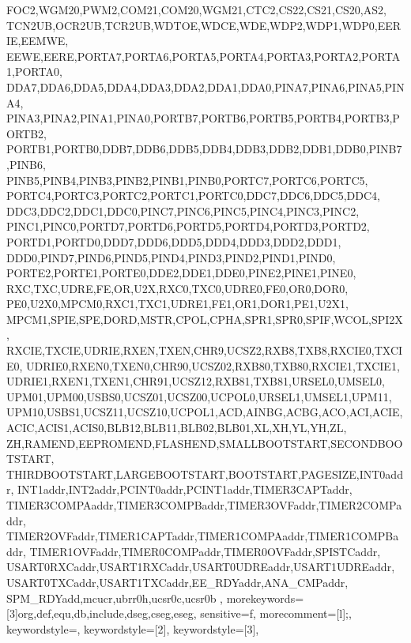 {{        FOC2,WGM20,PWM2,COM21,COM20,WGM21,CTC2,CS22,CS21,CS20,AS2,
        TCN2UB,OCR2UB,TCR2UB,WDTOE,WDCE,WDE,WDP2,WDP1,WDP0,EERIE,EEMWE,
        EEWE,EERE,PORTA7,PORTA6,PORTA5,PORTA4,PORTA3,PORTA2,PORTA1,PORTA0,
        DDA7,DDA6,DDA5,DDA4,DDA3,DDA2,DDA1,DDA0,PINA7,PINA6,PINA5,PINA4,
        PINA3,PINA2,PINA1,PINA0,PORTB7,PORTB6,PORTB5,PORTB4,PORTB3,PORTB2,
        PORTB1,PORTB0,DDB7,DDB6,DDB5,DDB4,DDB3,DDB2,DDB1,DDB0,PINB7,PINB6,
        PINB5,PINB4,PINB3,PINB2,PINB1,PINB0,PORTC7,PORTC6,PORTC5,
        PORTC4,PORTC3,PORTC2,PORTC1,PORTC0,DDC7,DDC6,DDC5,DDC4,
        DDC3,DDC2,DDC1,DDC0,PINC7,PINC6,PINC5,PINC4,PINC3,PINC2,
        PINC1,PINC0,PORTD7,PORTD6,PORTD5,PORTD4,PORTD3,PORTD2,
        PORTD1,PORTD0,DDD7,DDD6,DDD5,DDD4,DDD3,DDD2,DDD1,
        DDD0,PIND7,PIND6,PIND5,PIND4,PIND3,PIND2,PIND1,PIND0,
        PORTE2,PORTE1,PORTE0,DDE2,DDE1,DDE0,PINE2,PINE1,PINE0,
        RXC,TXC,UDRE,FE,OR,U2X,RXC0,TXC0,UDRE0,FE0,OR0,DOR0,
        PE0,U2X0,MPCM0,RXC1,TXC1,UDRE1,FE1,OR1,DOR1,PE1,U2X1,
        MPCM1,SPIE,SPE,DORD,MSTR,CPOL,CPHA,SPR1,SPR0,SPIF,WCOL,SPI2X,
        RXCIE,TXCIE,UDRIE,RXEN,TXEN,CHR9,UCSZ2,RXB8,TXB8,RXCIE0,TXCIE0,
        UDRIE0,RXEN0,TXEN0,CHR90,UCSZ02,RXB80,TXB80,RXCIE1,TXCIE1,
        UDRIE1,RXEN1,TXEN1,CHR91,UCSZ12,RXB81,TXB81,URSEL0,UMSEL0,
        UPM01,UPM00,USBS0,UCSZ01,UCSZ00,UCPOL0,URSEL1,UMSEL1,UPM11,
        UPM10,USBS1,UCSZ11,UCSZ10,UCPOL1,ACD,AINBG,ACBG,ACO,ACI,ACIE,
        ACIC,ACIS1,ACIS0,BLB12,BLB11,BLB02,BLB01,XL,XH,YL,YH,ZL,
        ZH,RAMEND,EEPROMEND,FLASHEND,SMALLBOOTSTART,SECONDBOOTSTART,
        THIRDBOOTSTART,LARGEBOOTSTART,BOOTSTART,PAGESIZE,INT0addr,
        INT1addr,INT2addr,PCINT0addr,PCINT1addr,TIMER3CAPTaddr,
        TIMER3COMPAaddr,TIMER3COMPBaddr,TIMER3OVFaddr,TIMER2COMPaddr,
        TIMER2OVFaddr,TIMER1CAPTaddr,TIMER1COMPAaddr,TIMER1COMPBaddr,
        TIMER1OVFaddr,TIMER0COMPaddr,TIMER0OVFaddr,SPISTCaddr,
        USART0RXCaddr,USART1RXCaddr,USART0UDREaddr,USART1UDREaddr,
        USART0TXCaddr,USART1TXCaddr,EE_RDYaddr,ANA_CMPaddr,
        SPM_RDYadd,mcucr,ubrr0h,ucsr0c,ucsr0b
    },
    morekeywords=[3]{org,def,equ,db,include,dseg,cseg,eseg},
    sensitive=f,
    morecomment=[l];,
    keywordstyle=\color{darkblue}, %
    keywordstyle=[2]\color{burntorange}, %
    keywordstyle=[3]\color{purple}, %
}

\newcommand{\avrasm}[2]{
    \begin{itemize}
        \item[]
    \end{itemize}
}
